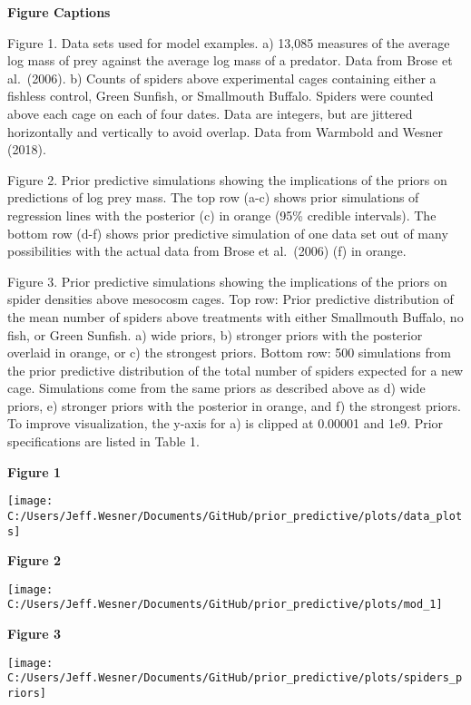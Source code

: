 \documentclass[
  12pt,
]{article}
\begin{document}
\newpage

\textbf{Figure Captions}

Figure 1. Data sets used for model examples. a) 13,085 measures of the
average log mass of prey against the average log mass of a predator.
Data from Brose et al.~(2006). b) Counts of spiders above experimental
cages containing either a fishless control, Green Sunfish, or Smallmouth
Buffalo. Spiders were counted above each cage on each of four dates.
Data are integers, but are jittered horizontally and vertically to avoid
overlap. Data from Warmbold and Wesner (2018).

Figure 2. Prior predictive simulations showing the implications of the
priors on predictions of log prey mass. The top row (a-c) shows prior
simulations of regression lines with the posterior (c) in orange (95\%
credible intervals). The bottom row (d-f) shows prior predictive
simulation of one data set out of many possibilities with the actual
data from Brose et al.~(2006) (f) in orange.

Figure 3. Prior predictive simulations showing the implications of the
priors on spider densities above mesocosm cages. Top row: Prior
predictive distribution of the mean number of spiders above treatments
with either Smallmouth Buffalo, no fish, or Green Sunfish. a) wide
priors, b) stronger priors with the posterior overlaid in orange, or c)
the strongest priors. Bottom row: 500 simulations from the prior
predictive distribution of the total number of spiders expected for a
new cage. Simulations come from the same priors as described above as d)
wide priors, e) stronger priors with the posterior in orange, and f) the
strongest priors. To improve visualization, the y-axis for a) is clipped
at 0.00001 and 1e9. Prior specifications are listed in Table 1.

\newpage

\textbf{Figure 1}

\texttt{[image: C:/Users/Jeff.Wesner/Documents/GitHub/prior\_predictive/plots/data\_plots]}

\newpage

\textbf{Figure 2}

\texttt{[image: C:/Users/Jeff.Wesner/Documents/GitHub/prior\_predictive/plots/mod\_1]}

\newpage

\textbf{Figure 3}

\texttt{[image: C:/Users/Jeff.Wesner/Documents/GitHub/prior\_predictive/plots/spiders\_priors]}
\end{document}
